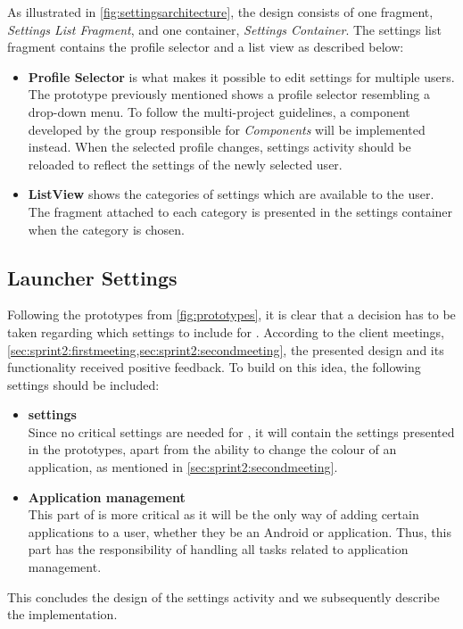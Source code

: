 As illustrated in \cref{fig:settingsarchitecture}, the design consists of one fragment, \textit{Settings List Fragment}, and one container, \textit{Settings Container}.
The settings list fragment contains the profile selector and a list view as described below:
\begin{itemize}
\item \textbf{Profile Selector} is what makes it possible to edit settings for multiple users.
The prototype previously mentioned shows a profile selector resembling a drop-down menu.
To follow the multi-project guidelines, a component developed by the group responsible for \textit{\giraf Components} will be implemented instead.
When the selected profile changes, settings activity should be reloaded to reflect the settings of the newly selected user.
\item \textbf{ListView} shows the categories of settings which are available to the user.
The fragment attached to each category is presented in the settings container when the category is chosen.
\end{itemize}

\subsection{Launcher Settings}\label{sec:launchersettings}
Following the prototypes from \cref{fig:prototypes}, it is clear that a decision has to be taken regarding which settings to include for \launcher.
According to the client meetings, \cref{sec:sprint2:firstmeeting,sec:sprint2:secondmeeting}, the presented design and its functionality received positive feedback.
To build on this idea, the following settings should be included:

\begin{itemize}
\item \textbf{\launcher settings}\\
Since no critical settings are needed for \launcher, it will contain the settings presented in the prototypes, apart from the ability to change the colour of an application, as mentioned in \cref{sec:sprint2:secondmeeting}.
\item \textbf{Application management}\\
This part of \launcher is more critical as it will be the only way of adding certain applications to a user, whether they be an Android or \giraf application.
Thus, this part has the responsibility of handling all tasks related to application management.
\end{itemize}

This concludes the design of the settings activity and we subsequently describe the implementation.